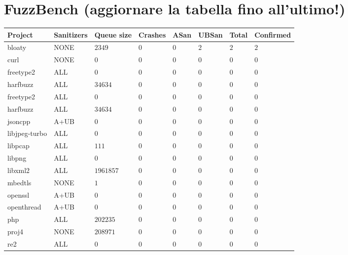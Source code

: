 


\newpage
\section{FuzzBench (aggiornare la tabella fino all'ultimo!)} \label{fuzzbench-table}
\begin{adjustbox}{width=\textwidth,center}
\begin{tabular}{|l|l|l|l|l|l|l|l|}
\hline
\textbf{Project} & \textbf{Sanitizers} & \textbf{Queue size} & \textbf{Crashes} & \textbf{ASan} & \textbf{UBSan} & \textbf{Total} & \textbf{Confirmed}  \\ 
\hline
bloaty   &NONE   &$2349$   &$0$   &$0$   &$2$   &$2$   &$2$ \\
curl   &NONE   &$0$   &$0$   &$0$   &$0$   &$0$   &$0$ \\
freetype2   &ALL   &$0$   &$0$   &$0$   &$0$   &$0$   &$0$ \\
harfbuzz   &ALL   &$34634$   &$0$   &$0$   &$0$   &$0$   &$0$ \\
freetype2   &ALL   &$0$   &$0$   &$0$   &$0$   &$0$   &$0$ \\
harfbuzz   &ALL   &$34634$   &$0$   &$0$   &$0$   &$0$   &$0$ \\
jsoncpp   &A+UB   &$0$   &$0$   &$0$   &$0$   &$0$   &$0$ \\
libjpeg-turbo   &ALL   &$0$   &$0$   &$0$   &$0$   &$0$   &$0$ \\
libpcap   &ALL   &$111$   &$0$   &$0$   &$0$   &$0$   &$0$ \\
libpng   &ALL   &$0$   &$0$   &$0$   &$0$   &$0$   &$0$ \\
libxml2   &ALL   &$1961857$   &$0$   &$0$   &$0$   &$0$   &$0$ \\
mbedtls   &NONE   &$1$   &$0$   &$0$   &$0$   &$0$   &$0$ \\
openssl   &A+UB   &$0$   &$0$   &$0$   &$0$   &$0$   &$0$ \\
openthread   &A+UB   &$0$   &$0$   &$0$   &$0$   &$0$   &$0$ \\
php   &ALL   &$202235$   &$0$   &$0$   &$0$   &$0$   &$0$ \\
proj4   &NONE   &$208971$   &$0$   &$0$   &$0$   &$0$   &$0$ \\
re2   &ALL   &$0$   &$0$   &$0$   &$0$   &$0$   &$0$ \\

\end{tabular}
\end{adjustbox}
